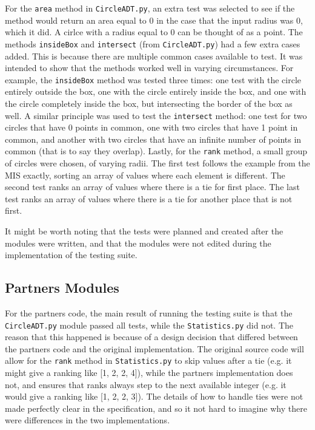 \documentclass[12pt]{article}
\begin{document}
For the {\tt area} method in {\tt CircleADT.py}, an extra test was selected to see if the method would return an area equal to 0 in the case that the input radius was 0, which it did. A cirlce with a radius equal to 0 can be thought of as a point. The methods {\tt insideBox} and {\tt intersect} (from {\tt CircleADT.py}) had a few extra cases added. This is because there are multiple common cases available to test. It was intended to show that the methods worked well in varying circumstances. For example, the {\tt insideBox} method was tested three times: one test with the circle entirely outside the box, one with the circle entirely inside the box, and one with the circle completely inside the box, but intersecting the border of the box as well. A similar principle was used to test the {\tt intersect} method: one test for two circles that have 0 points in common, one with two circles that have 1 point in common, and another with two circles that have an infinite number of points in common (that is to say they overlap). Lastly, for the {\tt rank} method, a small group of circles were chosen, of varying radii. The first test follows the example from the MIS exactly, sorting an array of values where each element is different. The second test ranks an array of values where there is a tie for first place. The last test ranks an array of values where there is a tie for another place that is not first. 

It might be worth noting that the tests were planned and created after the modules were written, and that the modules were not edited during the implementation of the testing suite.

\subsection{Partners Modules}

For the partners code, the main result of running the testing suite is that the {\tt CircleADT.py} module passed all tests, while the {\tt Statistics.py} did not. The reason that this happened is because of a design decision that differed between the partners code and the original implementation. The original source code will allow for the {\tt rank} method in {\tt Statistics.py} to skip values after a tie (e.g. it might give a ranking like [1, 2, 2, 4]), while the partners implementation does not, and ensures that ranks always step to the next available integer (e.g. it would give a ranking like [1, 2, 2, 3]). The details of how to handle ties were not made perfectly clear in the specification, and so it not hard to imagine why there were differences in the two implementations. 
\end{document}
